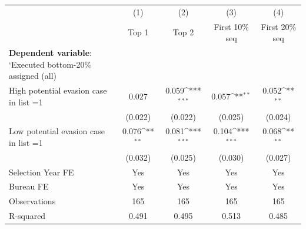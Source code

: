 {
\def\sym#1{\ifmmode^{#1}\else\(^{#1}\)\fi}
\begin{tabular}{l*{4}{c}}
\toprule
            &\multicolumn{1}{c}{(1)}&\multicolumn{1}{c}{(2)}&\multicolumn{1}{c}{(3)}&\multicolumn{1}{c}{(4)}\\
            &\multicolumn{1}{c}{Top 1}&\multicolumn{1}{c}{Top 2}&\multicolumn{1}{c}{First 10\% seq}&\multicolumn{1}{c}{First 20\% seq}\\
\midrule
\textbf{Dependent variable}: `Executed bottom-20\% \/ assigned (all)&                     &                     &                     &                     \\
\addlinespace
High potential evasion case in list =1&       0.027         &       0.059\sym{***}&       0.057\sym{**} &       0.052\sym{**} \\
            &     (0.022)         &     (0.022)         &     (0.025)         &     (0.024)         \\
\addlinespace
Low potential evasion case in list =1&       0.076\sym{**} &       0.081\sym{***}&       0.104\sym{***}&       0.068\sym{**} \\
            &     (0.032)         &     (0.025)         &     (0.030)         &     (0.027)         \\
\midrule
Selection Year FE&         Yes         &         Yes         &         Yes         &         Yes         \\
Bureau FE   &         Yes         &         Yes         &         Yes         &         Yes         \\
Observations&         165         &         165         &         165         &         165         \\
R-squared   &       0.491         &       0.495         &       0.513         &       0.485         \\
\bottomrule
\end{tabular}
}
